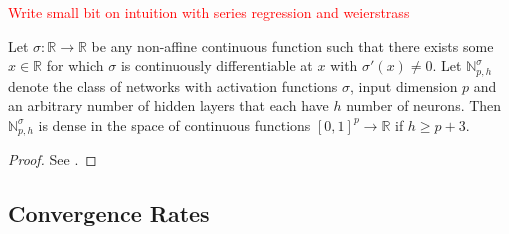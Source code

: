 \textcolor{red}{Write small bit on intuition with series regression and weierstrass}


\begin{theorem}
    Let $\sigma : \mathbb{R} \to \mathbb{R}$ be any non-affine continuous function such
    that there exists some $x \in \mathbb{R}$ for which $\sigma$ is continuously
    differentiable at $x$ with $\sigma'(x) \neq 0$. Let $\mathbb{N}_{p, h}^\sigma$
    denote the class of networks with activation functions $\sigma$, input dimension
    $p$ and an arbitrary number of hidden layers that each have $h$ number of neurons.
    Then $\mathbb{N}_{p,h}^\sigma$ is dense in the space of continuous functions
    $[0, 1]^p \to \mathbb{R}$ if $h \geq p + 3$.
\end{theorem}
\begin{proof}
    See \cite{Kidger.2020}.
\end{proof}

\subsection{Convergence Rates}

